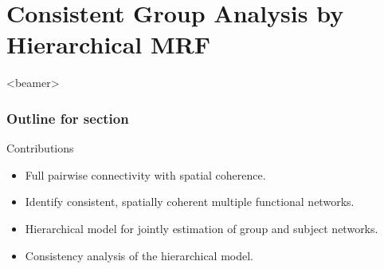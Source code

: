 \documentclass[sansserif, 10pt]{beamer}
\begin{document}
\section{Consistent Group Analysis by Hierarchical MRF}

\begin{frame}<beamer>
  \frametitle{Outline for section \thesection}
  \tableofcontents[currentsection, sectionstyle=show/hide, subsectionstyle=show/show/hide]

  \begin{block}{Contributions}
    \begin{itemize}
    \item Full pairwise connectivity with spatial coherence.
    \item Identify consistent, spatially coherent multiple functional networks.
    \item \alert{Hierarchical model for jointly estimation of group and subject networks.}
    \item \alert{Consistency analysis of the hierarchical model.}
    \end{itemize}
  \end{block}

\end{frame}
\end{document}
